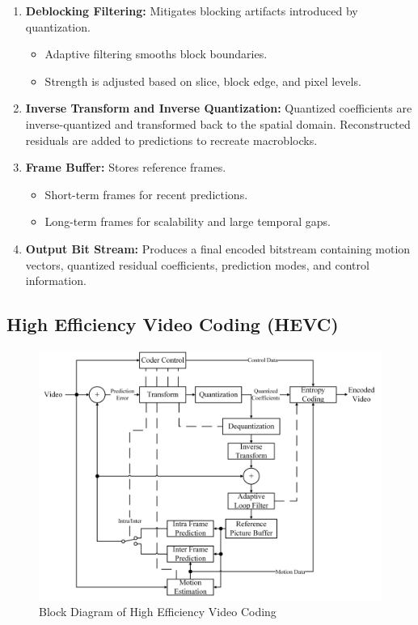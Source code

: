 \documentclass{ioereport}
\begin{document}
\begin{enumerate}[label=\textbf{\roman*.}]
        \item \textbf{Deblocking Filtering:}  
        Mitigates blocking artifacts introduced by quantization.
        \begin{itemize}
            \item Adaptive filtering smooths block boundaries.
            \item Strength is adjusted based on slice, block edge, and pixel levels.
        \end{itemize}
    
        \item \textbf{Inverse Transform and Inverse Quantization:}  
        Quantized coefficients are inverse-quantized and transformed back to the spatial domain. Reconstructed residuals are added to predictions to recreate macroblocks.
    
        \item \textbf{Frame Buffer:}  
        Stores reference frames.
        \begin{itemize}
            \item Short-term frames for recent predictions.
            \item Long-term frames for scalability and large temporal gaps.
        \end{itemize}
    
        \item \textbf{Output Bit Stream:}  
        Produces a final encoded bitstream containing motion vectors, quantized residual coefficients, prediction modes, and control information.
    \end{enumerate}

    \subsection{High Efficiency Video Coding (HEVC)}
        \begin{figure}[H]
        \centering
        \includegraphics[width=0.95\linewidth]{assets/h265_blockdiagram.png}
        \caption{Block Diagram of High Efficiency Video Coding}
        \label{fig:hevc}
    \end{figure}
\end{document}
